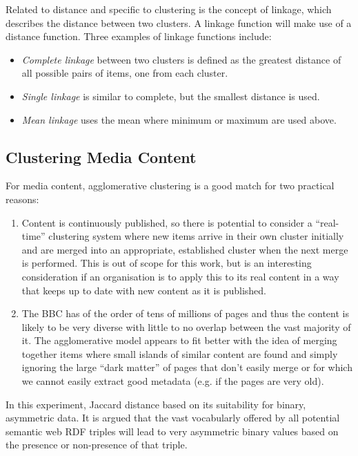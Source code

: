 Related to distance and specific to clustering is the concept of
linkage, which describes the distance between two clusters. A linkage
function will make use of a distance function. Three examples
of linkage functions include:

\begin{itemize}
\item \emph{Complete linkage} between two clusters is defined as the
  greatest distance of all possible pairs of items, one from each
  cluster.
\item \emph{Single linkage} is similar to complete, but the smallest
  distance is used.
\item \emph{Mean linkage} uses the mean where minimum or maximum
  are used above.
\end{itemize}

\subsection{Clustering Media Content}
\label{sec:clustering-media}

For media content, agglomerative clustering is a good match for two
practical reasons:

\begin{enumerate}
\item Content is continuously published, so there is potential
  to consider a ``real-time'' clustering system where new items
  arrive in their own cluster initially and are merged into an
  appropriate, established cluster when the next merge is performed.
  This is out of scope for this work, but is an interesting
  consideration if an organisation is to apply this to its real
  content in a way that keeps up to date with new content as it is
  published.
\item The BBC has of the order of tens of millions of pages and thus
  the content is likely to be very diverse with little to no overlap
  between the vast majority of it. The agglomerative model appears to
  fit better with the idea of merging together items where small
  islands of similar content are found and simply ignoring the large
  ``dark matter'' of pages that don't easily merge or for which we
  cannot easily extract good metadata (e.g. if the pages are very
  old).
\end{enumerate}

In this experiment, Jaccard distance\cite{witten2005data}
based on its suitability for binary, asymmetric data. It is argued
that the vast vocabularly offered by all potential semantic web
RDF triples will lead to very asymmetric binary values based on the
presence or non-presence of that triple.

